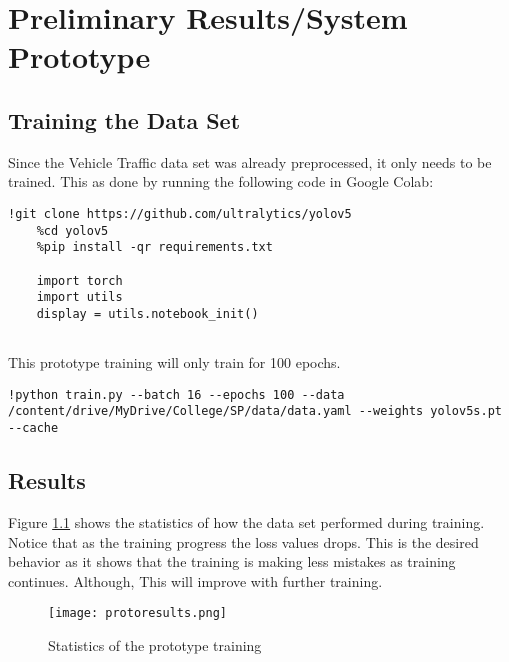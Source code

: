 \chapter{Preliminary Results/System Prototype}

\section{Training the Data Set}

Since the Vehicle Traffic data set was already preprocessed, it only needs to be trained. This as done by running the following code in Google Colab:

\begin{lstlisting}[frame=single]
	!git clone https://github.com/ultralytics/yolov5
	%cd yolov5
	%pip install -qr requirements.txt
	
	import torch
	import utils
	display = utils.notebook_init()
	
\end{lstlisting}

This prototype training will only train for 100 epochs.

\begin{lstlisting}[frame=single]
		!python train.py --batch 16 --epochs 100 --data /content/drive/MyDrive/College/SP/data/data.yaml --weights yolov5s.pt --cache
\end{lstlisting}

\newpage


\section{Results}

Figure \ref{fig:protores} shows the statistics of how the data set performed during training. Notice that as the training progress the loss values drops. This is the desired behavior as it shows that the training is making less mistakes as training continues. Although, This will improve with further training. 

\begin{figure}[h!]
	\texttt{[image: protoresults.png]}
	\caption{Statistics of the prototype training}
	\label{fig:protores}
\end{figure}

